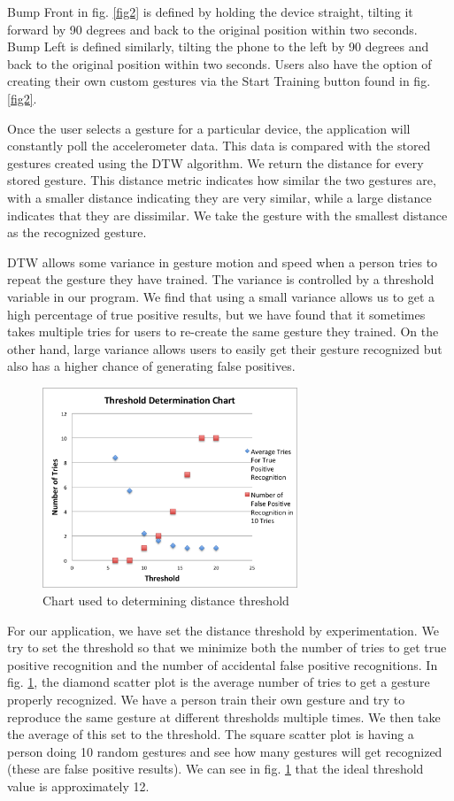 \documentclass[journal]{IEEEtran}
\begin{document}
Bump Front in fig. \ref{fig2} is defined by holding the device straight, tilting it forward by 90 degrees and back to the original position within two seconds. Bump Left is defined similarly, tilting the phone to the left by 90 degrees and back to the original position within two seconds. Users also have the option of creating their own custom gestures via the Start Training button found in fig. \ref{fig2}.

Once the user selects a gesture for a particular device, the application will constantly poll the accelerometer data. This data is compared with the stored gestures created using the DTW algorithm. We return the distance for every stored gesture. This distance metric indicates how similar the two gestures are, with a smaller distance indicating they are very similar, while a large distance indicates that they are dissimilar. We take the gesture with the smallest distance as the recognized gesture. 

DTW allows some variance in gesture motion and speed when a person tries to repeat the gesture they have trained. The variance is controlled by a threshold variable in our program. We find that using a small variance allows us to get a high percentage of true positive results, but we have found that it sometimes takes multiple tries for users to re-create the same gesture they trained. On the other hand, large variance allows users to easily get their gesture recognized but also has a higher chance of generating false positives.

\begin{figure}[H]
\centering
\includegraphics[width=3in]{threshold.png}
\caption{Chart used to determining distance threshold}
\label{fig3}
\end{figure}

	For our application, we have set the distance threshold by experimentation. We try to set the threshold so that we minimize both the number of tries to get true positive recognition and the number of accidental false positive recognitions. In fig. \ref{fig3}, the diamond scatter plot is the average number of tries to get a gesture properly recognized. We have a person train their own gesture and try to reproduce the same gesture at different thresholds multiple times. We then take the average of this set to the threshold. The square scatter plot is having a person doing 10 random gestures and see how many gestures will get recognized (these are false positive results). We can see in fig. \ref{fig3} that the ideal threshold value is approximately 12.
\end{document}
